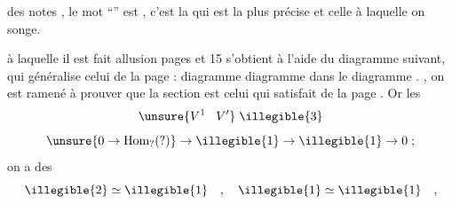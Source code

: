 

\uline{}

 des notes ,  
 le mot ``'' est , c'est la  qui est la
plus précise et celle à laquelle on songe.

 à laquelle il est fait allusion pages 
et 15 s'obtient à l'aide du diagramme suivant, qui généralise celui de la
page  :
 diagramme   diagramme 
  
 dans le diagramme . 
, on est ramené à prouver que la section
      
  est celui qui 
 satisfait   de la
page . Or les  
\[ \unsure{V^1 \;\;\; V'} \;\illegible{3} \]
\margin{\unsure{||}} 
\[ \unsure{0 \to \mathrm{Hom}_{?}(?)} \to \illegible{1} \to \illegible{1} \to 0 \; ; \]
 on a des 
\[ \illegible{2} \simeq \illegible{1} \quad , \quad \illegible{1} \simeq \illegible{1} \quad , \]
  \unsure{)} 

